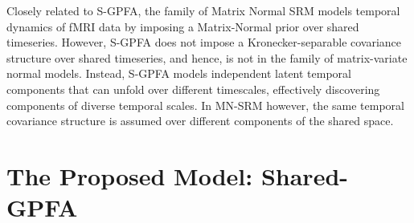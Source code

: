 Closely related to S-GPFA, the family of Matrix Normal SRM \cite{mnsrm} models temporal dynamics of fMRI data by imposing a Matrix-Normal prior over shared timeseries. However, S-GPFA does not impose a Kronecker-separable covariance structure over shared timeseries, and hence, is not in the family of matrix-variate normal models. Instead, S-GPFA models independent latent temporal components that can unfold over different timescales, effectively discovering components of diverse temporal scales. In MN-SRM however, the same temporal covariance structure is assumed over different components of the shared space.

\section{The Proposed Model: Shared-GPFA}
\label{ch1:sec:sgpfa}

